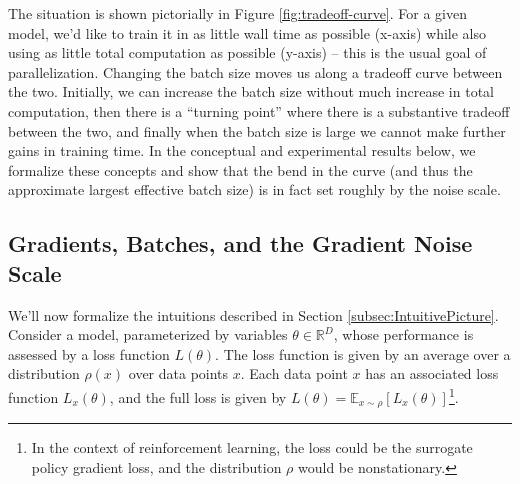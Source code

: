 \documentclass[english]{article}
\begin{document}
The situation is shown pictorially in Figure \ref{fig:tradeoff-curve}. For a given model, we'd like to train it in as little wall time as possible (x-axis) while also using as little total computation as possible (y-axis) -- this is the usual goal of parallelization. Changing the batch size moves us along a tradeoff curve between the two. Initially, we can increase the batch size without much increase in total computation, then there is a ``turning point'' where there is a substantive tradeoff between the two, and finally when the batch size is large we cannot make further gains in training time. In the conceptual and experimental results below, we formalize these concepts and show that the bend in the curve (and thus the approximate largest effective batch size) is in fact set roughly by the noise scale.

\subsection{Gradients, Batches, and the Gradient Noise Scale}

\label{sec:gradients}

We'll now formalize the intuitions described in Section \ref{subsec:IntuitivePicture}. Consider a model, parameterized by variables $\theta\in\mathbb{R}^{D}$, whose performance is assessed by a loss function $L\left(\theta\right)$. The loss function is given by an average over a distribution $\rho\left(x\right)$ over data points $x$. Each data point $x$ has an associated loss function $L_{x}\left(\theta\right)$, and the full loss is given by $L\left(\theta\right)=\mathbb{E}_{x\sim\rho}\left[L_{x}\left(\theta\right)\right]$\footnote{In the context of reinforcement learning, the loss could be the surrogate policy gradient loss, and the distribution $\rho$ would be nonstationary.}.
\end{document}
